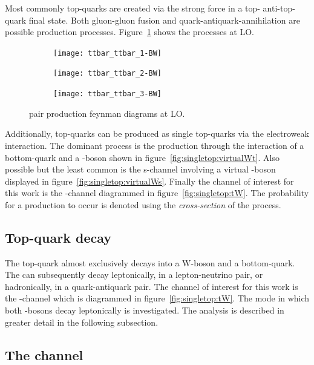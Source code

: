 Most commonly top-quarks are created via the strong force in a top- anti-top-quark final state. Both gluon-gluon fusion and quark-antiquark-annihilation are possible production processes. Figure~\ref{fig:ttpairLO} shows the processes at LO.
%
\begin{figure}[htbp]
  \begin{subfigure}[b]{0.3\textwidth}
  	\centering
    \texttt{[image: ttbar\_ttbar\_1-BW]}
  \end{subfigure}
  \quad
  \begin{subfigure}[b]{0.3\textwidth}
  	\centering
    \texttt{[image: ttbar\_ttbar\_2-BW]}
  \end{subfigure}
  \quad
  \begin{subfigure}[b]{0.3\textwidth}
  	\centering
    \texttt{[image: ttbar\_ttbar\_3-BW]}
  \end{subfigure} 
  \caption[\ttbar pair production feynman diagrams at LO]{\ttbar pair production feynman diagrams at LO.}
  \label{fig:ttpairLO}
\end{figure}
%
Additionally, top-quarks can be produced as single top-quarks via the electroweak interaction. The dominant process is the production through the interaction of a bottom-quark and a \PW-boson shown in figure~\ref{fig:singletop:virtualWt}. Also possible but the least common is the s-channel involving a virtual \PW-boson displayed in figure~\ref{fig:singletop:virtualWs}. Finally the channel of interest for this work is the \tW-channel diagrammed in figure~\ref{fig:singletop:tW}.
The probability for a production to occur is denoted using the \emph{cross-section} of the process.

\subsection{Top-quark decay}

The top-quark almost exclusively decays into a W-boson and a bottom-quark. The \PW can subsequently decay leptonically, in a lepton-neutrino pair, or hadronically, in a quark-antiquark pair.
The channel of interest for this work is the \tW-channel which is diagrammed in figure~\ref{fig:singletop:tW}. The mode in which both \PW-bosons decay leptonically is investigated.
The analysis is described in greater detail in the following subsection.


\subsection{The \tW channel}
\label{sec:tw}


